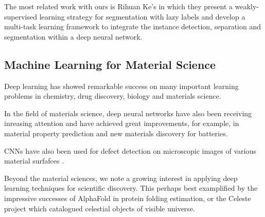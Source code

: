 \documentclass[10pt,twocolumn,letterpaper]{article}
\begin{document}
The most related work with ours is Rihuan Ke's\cite{ke2019multi} in which they present a weakly-supervised learning strategy for segmentation with lazy labels and develop a multi-task learning framework to integrate the instance detection, separation and segmentation within a deep neural network.

\subsection{Machine Learning for Material Science}
Deep learning has showed remarkable success on many important 
learning problems in chemistry, drug discovery, biology and materials science.

In the field of materials science, deep neural networks have also been receiving inreasing attention and have achieved great improvements, for example, in material property prediction and new materials discovery for batteries.

CNNs have also been used for defect detection on microscopic images of various material surfafces \cite{}.

Beyond the material sciences, we note a growing interest in applying deep learning techniques
for scientific discovery. 
This perhaps best examplified by the impressive successes of AlphaFold \cite{} in protein folding estimation,
or the Celeste \cite{} project which catalogued celestial objects of visible universe.
\end{document}
